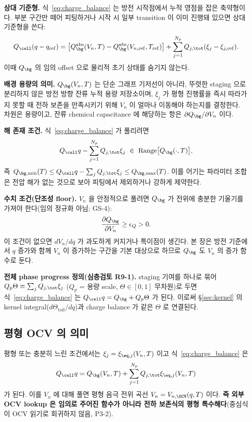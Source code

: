 \textbf{상대 기준형.} 식~\eqref{eq:charge_balance} 는 방전 시작점에서 누적 영점을 잡은 축약형이다.
부분 구간만 떼어 피팅하거나 시작 시 일부 transition 이 이미 진행돼 있으면 상대 기준형을 쓴다:
\begin{equation}
Q_\cell(q-q_\mathrm{ref})=\big[Q_\bg^\mathrm{abs}(V_n,T)-Q_\bg^\mathrm{abs}(V_{n,\mathrm{ref}},T_\mathrm{ref})\big]
+\sum_{j=1}^{N_p}Q_{j,\tot}(\xi_j-\xi_{j,\mathrm{ref}}).
\label{eq:charge_balance_rel}
\end{equation}
이때 $Q_\bg$ 의 임의 offset 으로 물리적 초기 상태를 숨기지 않는다.

\textbf{배경 용량의 의미.} $Q_\bg(V_n,T)$ 는 단순 그래프 기저선이 아니라, 뚜렷한 staging 으로 분리하지
않은 방전 방향 잔류 누적 용량 저장소이며, $\xi_j$ 가 평형 진행률을 즉시 따라가지 못할 때 전하 보존을
만족시키기 위해 $V_n$ 이 얼마나 이동해야 하는지를 결정한다. 차원은 용량이고, 잔류 chemical
capacitance 에 해당하는 항은 $\partial Q_\bg/\partial V_n$ 이다.

\textbf{해 존재 조건.} 식~\eqref{eq:charge_balance} 가 풀리려면
\begin{equation}
Q_\cell q-\sum_{j=1}^{N_p}Q_{j,\tot}\xi_j\ \in\ \mathrm{Range}\big[Q_\bg(\cdot,T)\big],
\label{eq:solexist}
\end{equation}
즉 $Q_{\bg,\min}(T)\le Q_\cell q-\sum_j Q_{j,\tot}\xi_j\le Q_{\bg,\max}(T)$. 이를 어기는 파라미터
조합은 전압 해가 없는 것으로 보아 피팅에서 제외하거나 강하게 제약한다.

\textbf{수치 조건(단조성 floor).} $V_n$ 을 안정적으로 풀려면 $Q_\bg$ 가 전위에 충분한 기울기를 가져야
한다(임의 정규화 아님; GS-4):
\begin{equation}
\frac{\partial Q_\bg}{\partial V_n}\ge \epsilon_Q>0.
\label{eq:monotone}
\end{equation}
이 조건이 없으면 $dV_n/dq$ 가 과도하게 커지거나 특이점이 생긴다. 본 장은 방전 기준에서 $q$ 증가와
함께 $V_n$ 이 증가하는 구간을 기본 대상으로 하므로 $Q_\bg$ 도 $V_n$ 의 증가 함수로 둔다.

\textbf{전체 phase progress 정의(심층검토 R9-1).} staging 기여를 하나로 묶어
$Q_p\Theta\equiv\sum_j Q_{j,\tot}\xi_j$ ($Q_p$ = 용량 scale, $\Theta\in[0,1]$ 무차원)로 두면
식~\eqref{eq:charge_balance} 는 $Q_\cell q=Q_\bg+Q_p\Theta$ 가 된다. 이로써 \S\ref{sec:kernel} 의
kernel integral($d\Theta_\mathrm{tail}/dq$)과 charge balance 가 같은 $\Theta$ 로 연결된다.

\subsection{평형 OCV 의 의미}\label{sec:ocv}
평형 또는 충분히 느린 조건에서는 $\xi_j=\xi_{\eq,j}(V_n,T)$ 이고 식~\eqref{eq:charge_balance} 은
\begin{equation}
Q_\cell q=Q_\bg(V_n,T)+\sum_{j=1}^{N_p}Q_{j,\tot}\xi_{\eq,j}(V_n,T)
\label{eq:ocv_implicit}
\end{equation}
가 된다. 이를 $V_n$ 에 대해 풀면 평형 음극 전위 곡선 $V_n=V_{n,\OCV}(q,T)$ 이다. \textbf{즉 외부 OCV
lookup 은 임의로 주어진 함수가 아니라 전하 보존식의 평형 특수해다}(중심식이 OCV 읽기로 회귀하지 않음, P3-2).

